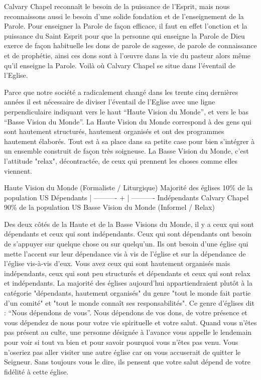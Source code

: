 Calvary Chapel reconnaît le besoin de la puissance de l’Esprit, mais nous reconnaissons aussi le besoin d’une solide
fondation et de l’enseignement de la Parole. Pour enseigner la Parole de façon efficace, il faut en effet l’onction et la
puissance du Saint Esprit pour que la personne qui enseigne la Parole de Dieu exerce de façon habituelle les dons de
parole de sagesse, de parole de connaissance et de prophétie, ainsi ces dons sont à l'œuvre dans la vie du pasteur
alors même qu’il enseigne la Parole. Voilà où Calvary Chapel se situe dans l’éventail de l’Eglise.

Parce que notre société a radicalement changé dans les trente cinq dernières années il est nécessaire de diviser
l’éventail de l’Eglise avec une ligne perpendiculaire indiquant vers le haut “Haute Vision du Monde”, et vers le bas
“Basse Vision du Monde”. La Haute Vision du Monde correspond à des gens qui sont hautement structurés,
hautement organisés et ont des programmes hautement élaborés. Tout est à sa place dans sa petite case pour bien
s'intégrer à un ensemble construit de façon très soigneuse. La Basse Vision du Monde, c’est l’attitude "relax",
décontractée, de ceux qui prennent les choses comme elles viennent.


Haute Vision du Monde
(Formaliste / Liturgique)
Majorité des églises
10\% de la population US
Dépendants
|
----------
+
|
----------
Indépendants
Calvary Chapel
90\% de la population US
Basse Vision du Monde
(Informel / Relax)

Des deux côtés de la Haute et de la Basse Visions du Monde, il y a ceux qui sont dépendants et ceux qui sont
indépendants. Ceux qui sont dépendants ont besoin de s’appuyer sur quelque chose ou sur quelqu'un. Ils ont besoin
d’une église qui mette l’accent sur leur dépendance vis à vis de l’église et sur la dépendance de l’église vis-à-vis d’eux.
Vous avez ceux qui sont hautement organisés mais indépendants, ceux qui sont peu structurés et dépendants et ceux
qui sont relax et indépendants. La majorité des églises aujourd’hui appartiendraient plutôt à la catégorie "dépendants,
hautement organisés" du genre "tout le monde fait partie d’un comité" et "tout le monde connaît ses responsabilités".
Ce genre d’églises dit : “Nous dépendons de vous”. Nous dépendons de vos dons, de votre présence et vous
dépendez de nous pour votre vie spirituelle et votre salut. Quand vous n’êtes pas présent au culte, une personne
désignée à l’avance vous appelle le lendemain pour voir si tout va bien et pour savoir pourquoi vous n’êtes pas venu.
Vous n’oseriez pas aller visiter une autre église car on vous accuserait de quitter le Seigneur. Sans toujours vous le
dire, ils pensent que votre salut dépend de votre fidélité à cette église.

